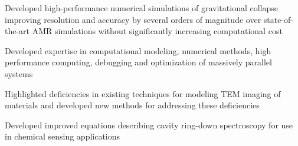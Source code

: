 
\begin{cventries}

{
  \begin{cvitems} %
    \item Developed high-performance numerical simulations of gravitational collapse improving resolution and accuracy by several orders of magnitude over state-of-the-art AMR simulations without significantly increasing computational cost
    \item Developed expertise in computational modeling, numerical methods, high performance computing, debugging and optimization of massively parallel systems
  \end{cvitems}
}

{
  \begin{cvitems}
    \item Highlighted deficiencies in existing techniques for modeling TEM imaging of materials and developed new methods for addressing these deficiencies
    \item Developed improved equations describing cavity ring-down spectroscopy for use in chemical sensing applications
  \end{cvitems}
}

\end{cventries}

